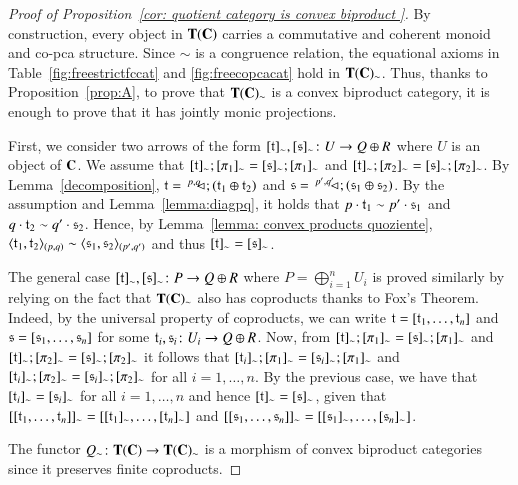 \begin{proof}[Proof of Proposition~\ref{cor: quotient category is convex biproduct }]
   By construction, every object in $\mathbf{T}(\mathbf{C})$ carries a commutative and coherent monoid and co-pca structure. Since $\sim$ is a congruence relation, the equational axioms in Table~\ref{fig:freestrictfccat} and \ref{fig:freecopcacat}  hold in $\mathbf{T}(\mathbf{C})_\sim$. Thus, thanks to Proposition~\ref{prop:A}, to prove that $\mathbf{T}(\mathbf{C})_\sim$ is a convex biproduct category, it is enough to prove that it has jointly monic projections.
  
  
First, we consider two arrows of the form $[\mathfrak{t}]_\sim,[\mathfrak{s}]_\sim\colon U\to Q\oplus R$ where $U$ is an object of $\mathbf{C}$. We assume that $[\mathfrak{t}]_\sim;[\pi_1]_\sim = [\mathfrak{s}]_\sim;[\pi_1]_\sim$ and $[\mathfrak{t}]_\sim;[\pi_2]_\sim = [\mathfrak{s}]_\sim;[\pi_2]_\sim$. By Lemma~\ref{decomposition}, $\mathfrak{t}=\,^{p,q}\!\! \lhd_{};(\mathfrak{t}_1\oplus \mathfrak{t}_2)$ and $\mathfrak{s}=\,^{p',q'}\!\! \lhd_{};(\mathfrak{s}_1\oplus \mathfrak{s}_2)$. By the assumption and Lemma~\ref{lemma:diagpq}, it holds that $p\cdot \mathfrak{t}_1 \sim p'\cdot \mathfrak{s}_1$ and $q\cdot \mathfrak{t}_2 \sim q'\cdot \mathfrak{s}_2$. Hence, by Lemma~\ref{lemma: convex products quoziente}, $\langle \mathfrak{t}_1,\mathfrak{t}_2\rangle_{(p,q)}\sim\langle \mathfrak{s}_1,\mathfrak{s}_2\rangle_{(p',q')}$ and thus $[\mathfrak{t}]_\sim=[\mathfrak{s}]_\sim$.
    
 The general case $[\mathfrak{t}]_\sim,[\mathfrak{s}]_\sim\colon P\to Q\oplus R$ where $P=\bigoplus_{i=1}^n U_i$ is proved similarly by relying on the fact that $\mathbf{T}(\mathbf{C})_\sim$  also has coproducts thanks to Fox's Theorem. Indeed, by the universal property of coproducts, we can write $\mathfrak{t} = [\mathfrak{t}_1,\dots,\mathfrak{t}_n]$ and $\mathfrak{s} = [\mathfrak{s}_1,\dots,\mathfrak{s}_n]$ for some $\mathfrak{t}_i,\mathfrak{s}_i\colon U_i \to Q\oplus R$. Now, from $[\mathfrak{t}]_\sim;[\pi_1]_\sim = [\mathfrak{s}]_\sim;[\pi_1]_\sim$ and $[\mathfrak{t}]_\sim;[\pi_2]_\sim = [\mathfrak{s}]_\sim;[\pi_2]_\sim$ it follows that $[\mathfrak{t}_i]_\sim;[\pi_1]_\sim = [\mathfrak{s}_i]_\sim;[\pi_1]_\sim$ and $[\mathfrak{t}_i]_\sim;[\pi_2]_\sim = [\mathfrak{s}_i]_\sim;[\pi_2]_\sim$ for all $i=1,\dots,n$. By the previous case, we have that $[\mathfrak{t}_i]_\sim=[\mathfrak{s}_i]_\sim$ for all $i=1,\dots,n$ and hence $[\mathfrak{t}]_\sim=[\mathfrak{s}]_\sim$, given that $[[\mathfrak{t}_1,\dots,\mathfrak{t}_n]]_\sim=[[\mathfrak{t}_1]_\sim,\dots,[\mathfrak{t}_n]_\sim]$ and $[[\mathfrak{s}_1,\dots,\mathfrak{s}_n]]_\sim=[[\mathfrak{s}_1]_\sim,\dots,[\mathfrak{s}_n]_\sim]$.

 The functor $Q_\sim\colon \mathbf{T}(\mathbf{C})\to \mathbf{T}(\mathbf{C})_\sim$ is a morphism of convex biproduct categories since it preserves finite coproducts.
\end{proof}

